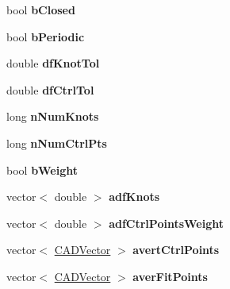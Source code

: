 \begin{DoxyCompactItemize}
\item 
bool {\bfseries b\+Closed}\hypertarget{class_c_a_d_spline_object_a4cb0e8bd7dff97afe477a12c9e402399}{}\label{class_c_a_d_spline_object_a4cb0e8bd7dff97afe477a12c9e402399}

\item 
bool {\bfseries b\+Periodic}\hypertarget{class_c_a_d_spline_object_a81dcdf8cf67585e77384f10ee2e06c95}{}\label{class_c_a_d_spline_object_a81dcdf8cf67585e77384f10ee2e06c95}

\item 
double {\bfseries df\+Knot\+Tol}\hypertarget{class_c_a_d_spline_object_a4b1db8e74d613d36833867ae584ca1d1}{}\label{class_c_a_d_spline_object_a4b1db8e74d613d36833867ae584ca1d1}

\item 
double {\bfseries df\+Ctrl\+Tol}\hypertarget{class_c_a_d_spline_object_a3de5406804fe092f18a7c983d3652b21}{}\label{class_c_a_d_spline_object_a3de5406804fe092f18a7c983d3652b21}

\item 
long {\bfseries n\+Num\+Knots}\hypertarget{class_c_a_d_spline_object_ab5ec1e7b61e11c83712d8acd83c4aaa6}{}\label{class_c_a_d_spline_object_ab5ec1e7b61e11c83712d8acd83c4aaa6}

\item 
long {\bfseries n\+Num\+Ctrl\+Pts}\hypertarget{class_c_a_d_spline_object_a79c8e36d830578d7257e6fc33b2c26bf}{}\label{class_c_a_d_spline_object_a79c8e36d830578d7257e6fc33b2c26bf}

\item 
bool {\bfseries b\+Weight}\hypertarget{class_c_a_d_spline_object_ab8366b4f2a788f05e65224f8dda2db33}{}\label{class_c_a_d_spline_object_ab8366b4f2a788f05e65224f8dda2db33}

\item 
vector$<$ double $>$ {\bfseries adf\+Knots}\hypertarget{class_c_a_d_spline_object_a639236743998516f40d7099acd89c152}{}\label{class_c_a_d_spline_object_a639236743998516f40d7099acd89c152}

\item 
vector$<$ double $>$ {\bfseries adf\+Ctrl\+Points\+Weight}\hypertarget{class_c_a_d_spline_object_a1f4d1f070cfa69b2d42429df07cf55f6}{}\label{class_c_a_d_spline_object_a1f4d1f070cfa69b2d42429df07cf55f6}

\item 
vector$<$ \hyperlink{class_c_a_d_vector}{C\+A\+D\+Vector} $>$ {\bfseries avert\+Ctrl\+Points}\hypertarget{class_c_a_d_spline_object_ab662b79697285f1439da7bfdf029e932}{}\label{class_c_a_d_spline_object_ab662b79697285f1439da7bfdf029e932}

\item 
vector$<$ \hyperlink{class_c_a_d_vector}{C\+A\+D\+Vector} $>$ {\bfseries aver\+Fit\+Points}\hypertarget{class_c_a_d_spline_object_a3105c49e863ced42d9d4613ff665fd5b}{}\label{class_c_a_d_spline_object_a3105c49e863ced42d9d4613ff665fd5b}

\end{DoxyCompactItemize}
